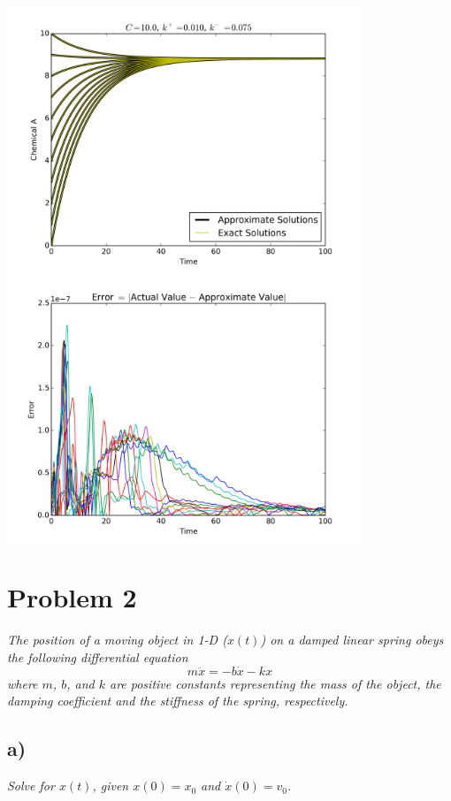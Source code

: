 \documentclass[12pt]{article}
\begin{document}
\begin{center}
	\includegraphics[width=400px]{figures/1_b_1.png}
	\includegraphics[width=400px]{figures/1_b_2.png}
\end{center}

\section*{Problem 2}
{\it The position of a moving object in 1-D ($x(t)$) on a damped linear spring obeys the following differential equation}
\begin{equation}
	\label{change_position}
	m\ddot{x} = -b\dot{x} - kx
\end{equation}
{\it where $m$, $b$, and $k$ are positive constants representing the mass of the object, the damping coefficient and the stiffness of the spring, respectively.}

\subsection*{ a)}
{\it Solve for $x(t)$, given $x(0) = x_0$ and $\dot{x}(0) = v_0$.} \\
\end{document}

